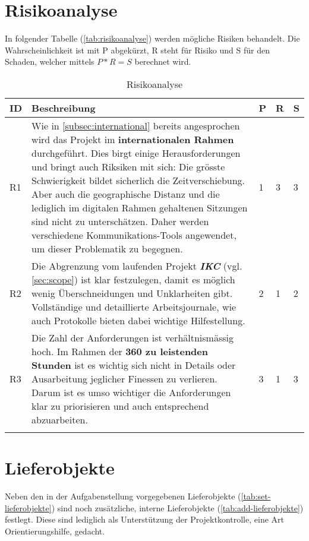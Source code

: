 \section{Risikoanalyse}

In folgender Tabelle (\autoref{tab:risikoanalyse}) werden mögliche Risiken behandelt. Die Wahrscheinlichkeit ist mit P abgekürzt, R steht für Risiko und S für den Schaden, welcher mittels $P*R=S$ berechnet wird.


\begin{longtable}{|p{0.5cm} | p{7cm} | p{1cm}|  p{1cm}|  p{1cm}|}
  \hline
    ID & Beschreibung &  P & R & S \\\hline
    R1 & Wie in \autoref{subsec:international} bereits angesprochen wird das Projekt im \textbf{internationalen Rahmen} durchgeführt. Dies birgt einige Herausforderungen und bringt auch Riksiken mit sich: Die grösste Schwierigkeit bildet sicherlich die Zeitverschiebung. Aber auch die geographische Distanz und die lediglich im digitalen Rahmen gehaltenen Sitzungen sind nicht zu unterschätzen. Daher werden verschiedene Kommunikations-Tools angewendet, um dieser Problematik zu begegnen. & 1 & 3 & 3\\\hline
    R2 & Die Abgrenzung vom laufenden Projekt \textbf{\textit{IKC}} (vgl. \autoref{sec:scope}) ist klar festzulegen, damit es möglich wenig Überschneidungen und Unklarheiten gibt. Vollständige und detaillierte Arbeitsjournale, wie auch Protokolle bieten dabei wichtige Hilfestellung.  & 2 & 1 & 2\\\hline
    R3 & Die Zahl der Anforderungen ist verhältnismässig hoch. Im Rahmen der \textbf{360 zu leistenden Stunden} ist es wichtig sich nicht in Details oder Ausarbeitung jeglicher Finessen zu verlieren. Darum ist es umso wichtiger die Anforderungen klar zu priorisieren und auch entsprechend abzuarbeiten.  & 3 & 1 & 3\\\hline
    \caption{Risikoanalyse}
  \label{tab:risikoanalyse}
\end{longtable}

\section{Lieferobjekte}\label{lieferobjekte}

Neben den in der Aufgabenstellung vorgegebenen Lieferobjekte (\autoref{tab:set-lieferobjekte}) sind noch zusätzliche, interne Lieferobjekte (\autoref{tab:add-lieferobjekte}) festlegt. Diese sind lediglich als Unterstützung der Projektkontrolle, eine Art Orientierungshilfe, gedacht.

